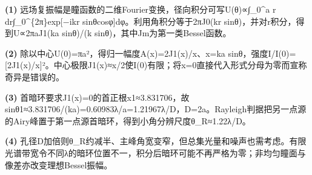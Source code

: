 \par\noindent\textbf{(1)} 远场复振幅是瞳函数的二维Fourier变换，径向积分可写U(θ)∝∫\_0\textasciicircum{}a r dr∫\_0\textasciicircum{}\{2π\}exp[−ikr sinθcosφ]dφ。利用角积分等于2πJ0(kr sinθ)，并对r积分，得到U∝2πaJ1(ka sinθ)/(k sinθ)，其中Jm为第一类Bessel函数。
\par\noindent\textbf{(2)} 除以中心U(0)=πa²，得归一幅度A(x)=2J1(x)/x、x=ka sinθ，强度I/I(0)=[2J1(x)/x]²。中心极限J1(x)≈x/2使I(0)有限；将x=0直接代入形式分母为零而宣称奇异是错误的。
\par\noindent\textbf{(3)} 首暗环要求J1(x)=0的首正根x1≈3.831706，故sinθ1≈3.831706/(ka)=0.60983λ/a=1.21967λ/D，D=2a。Rayleigh判据把另一点源的Airy峰置于第一点源首暗环，得到小角分辨尺度θ\_R≈1.22λ/D。
\par\noindent\textbf{(4)} 孔径D加倍则θ\_R约减半、主峰角宽变窄，但总集光量和噪声也需考虑。有限光谱带宽令不同λ的暗环位置不一，积分后暗环可能不再严格为零；非均匀瞳面与像差亦改变理想Bessel振幅。
